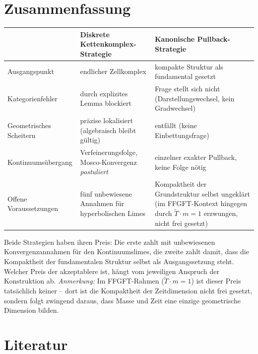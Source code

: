 \section{Zusammenfassung}

\begin{tabular}{p{4.2cm}p{5.7cm}p{5.7cm}}
\toprule
& \textbf{Diskrete Kettenkomplex-Strategie} & \textbf{Kanonische Pullback-Strategie}\\
\midrule
Ausgangspunkt & endlicher Zellkomplex & kompakte Struktur als fundamental gesetzt\\
Kategorienfehler & durch explizites Lemma blockiert & Frage stellt sich nicht (Darstellungswechsel, kein Gradwechsel)\\
Geometrisches Scheitern & präzise lokalisiert (algebraisch bleibt gültig) & entfällt (keine Einbettungsfrage)\\
Kontinuumsübergang & Verfeinerungsfolge, Mosco-Konvergenz \emph{postuliert} & einzelner exakter Pullback, keine Folge nötig\\
Offene Voraussetzungen & fünf unbewiesene Annahmen für hyperbolischen Limes & Kompaktheit der Grundstruktur selbst ungeklärt (im FFGFT-Kontext hingegen durch $\tilde{T}\cdot m=1$ erzwungen, nicht frei gesetzt)\\
\bottomrule
\end{tabular}

\medskip
Beide Strategien haben ihren Preis: Die erste zahlt mit unbewiesenen
Konvergenzannahmen für den Kontinuumslimes, die zweite zahlt damit, dass
die Kompaktheit der fundamentalen Struktur selbst als Ausgangssetzung
steht. Welcher Preis der akzeptablere ist, hängt vom jeweiligen Anspruch
der Konstruktion ab. \emph{Anmerkung:} Im FFGFT-Rahmen ($\tilde{T}\cdot m=1$)
ist dieser Preis tatsächlich keiner -- dort ist die Kompaktheit der
Zeitdimension nicht frei gesetzt, sondern folgt zwingend daraus, dass
Masse und Zeit eine einzige geometrische Dimension bilden.

\section{Literatur}

